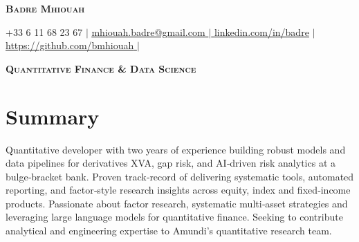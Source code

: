 \documentclass[letterpaper,10.6pt]{article}
\begin{document}


\begin{center}
    \textbf{\Huge \scshape Badre Mhiouah} 

    \small +33 6 11 68 23 67 $|$ \href{mailto:badre.mhiouah@student-cs.fr}{\underline{mhiouah.badre@gmail.com} $|$ 
    \href{https://www.linkedin.com/in/badre-mhiouah-194401227/}{\underline{linkedin.com/in/badre}}} $|$ \href{https://github.com/bmhiouah}{\underline{https://github.com/bmhiouah} $|$ }
    
\end{center}

\begin{center}
\textbf {\scshape Quantitative Finance \& Data Science} 
\end{center}

\section{Summary}
\small{Quantitative developer with two years of experience building robust models and data pipelines for derivatives XVA, gap risk, and AI‑driven risk analytics at a bulge‑bracket bank. Proven track‑record of delivering systematic tools, automated reporting, and factor‑style research insights across equity, index and fixed‑income products. Passionate about factor research, systematic multi‑asset strategies and leveraging large language models for quantitative finance. Seeking to contribute analytical and engineering expertise to Amundi’s quantitative research team.}

\end{document}
